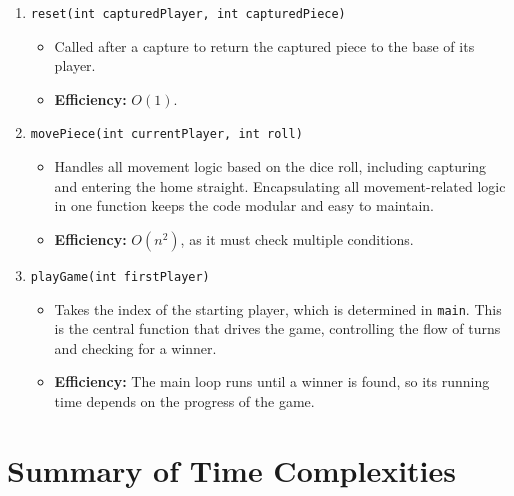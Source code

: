 \documentclass[11pt,a4paper]{article}
\newcommand{\code}[1]{\texttt{#1}}
\begin{document}
\begin{enumerate}[label=\arabic*.,leftmargin=*,itemsep=0.8em]
  \item \code{reset(int capturedPlayer, int capturedPiece)}
  \begin{itemize}[nosep]
    \item Called after a capture to return the captured piece to the base of
          its player.
    \item \textbf{Efficiency:} $O(1)$.
  \end{itemize}

  \item \code{movePiece(int currentPlayer, int roll)}
  \begin{itemize}[nosep]
    \item Handles all movement logic based on the dice roll, including
          capturing and entering the home straight. Encapsulating all
          movement-related logic in one function keeps the code modular and
          easy to maintain.
    \item \textbf{Efficiency:} $O(n^2)$, as it must check multiple conditions.
  \end{itemize}

  \item \code{playGame(int firstPlayer)}
  \begin{itemize}[nosep]
    \item Takes the index of the starting player, which is determined in
          \code{main}. This is the central function that drives the game,
          controlling the flow of turns and checking for a winner.
    \item \textbf{Efficiency:} The main loop runs until a winner is found, so
          its running time depends on the progress of the game.
  \end{itemize}

\end{enumerate}

\section{Summary of Time Complexities}
\end{document}

